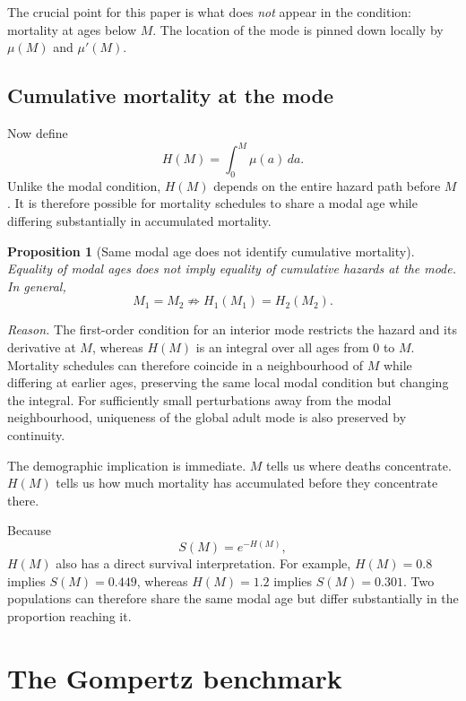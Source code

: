 \documentclass[doublespace]{interact}
\newtheorem{proposition}{Proposition}
\begin{document}
The crucial point for this paper is what does \emph{not} appear in the condition: mortality at ages below $M$. The location of the mode is pinned down locally by $\mu(M)$ and $\mu'(M)$.

\subsection{Cumulative mortality at the mode}

Now define
\begin{equation}
\boxed{H(M)=\int_0^M\mu(a)\,da.}
\end{equation}
Unlike the modal condition, $H(M)$ depends on the entire hazard path before $M$. It is therefore possible for mortality schedules to share a modal age while differing substantially in accumulated mortality.

\begin{proposition}[Same modal age does not identify cumulative mortality]
Equality of modal ages does not imply equality of cumulative hazards at the mode. In general,
\[
M_1=M_2 \not\Rightarrow H_1(M_1)=H_2(M_2).
\]
\end{proposition}

\noindent\textit{Reason.} The first-order condition for an interior mode restricts the hazard and its derivative at $M$, whereas $H(M)$ is an integral over all ages from 0 to $M$. Mortality schedules can therefore coincide in a neighbourhood of $M$ while differing at earlier ages, preserving the same local modal condition but changing the integral. For sufficiently small perturbations away from the modal neighbourhood, uniqueness of the global adult mode is also preserved by continuity.

The demographic implication is immediate. $M$ tells us where deaths concentrate. $H(M)$ tells us how much mortality has accumulated before they concentrate there.

Because
\begin{equation}
S(M)=e^{-H(M)},
\end{equation}
$H(M)$ also has a direct survival interpretation. For example, $H(M)=0.8$ implies $S(M)=0.449$, whereas $H(M)=1.2$ implies $S(M)=0.301$. Two populations can therefore share the same modal age but differ substantially in the proportion reaching it.

\section{The Gompertz benchmark}
\end{document}
